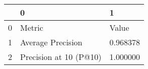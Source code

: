 \begin{tabular}{lll}
\toprule
 & 0 & 1 \\
\midrule
0 & Metric & Value \\
1 & Average Precision & 0.968378 \\
2 & Precision at 10 (P@10) & 1.000000 \\
\bottomrule
\end{tabular}
